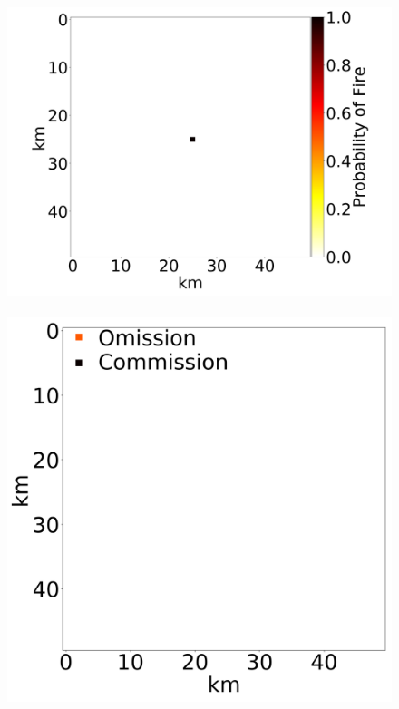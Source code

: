 \documentclass[smallcondensed]{svjour3}     %
\begin{document}
\begin{figure}[htbp]
	~
	\includegraphics[height=0.17\textheight]{exampleNetworkProcessed3.png}
	~
	\includegraphics[height=0.17\textheight]{exampleNetworkError3.png}
	\\

\end{figure}
\end{document}
